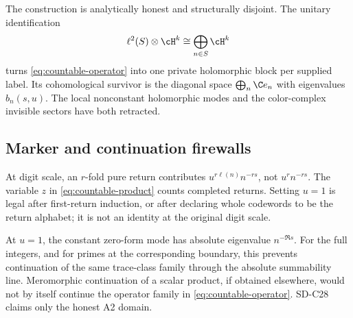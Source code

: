 The construction is analytically honest and structurally disjoint.  The
unitary identification
\begin{equation}
 \ell^2(S)\otimes\cH^k
 \cong\bigoplus_{n\in S}\cH^k
 \label{eq:unitary-disjoint}
\end{equation}
turns \eqref{eq:countable-operator} into one private holomorphic block per
supplied label.  Its cohomological survivor is the diagonal space
\(\bigoplus_n\C e_n\) with eigenvalues \(b_n(s,u)\).  The local nonconstant
holomorphic modes and the color-complex invisible sectors have both
retracted.

\subsection{Marker and continuation firewalls}

At digit scale, an \(r\)-fold pure return contributes
\(u^{r\ell(n)}n^{-rs}\), not \(u^rn^{-rs}\).  The variable \(z\) in
\eqref{eq:countable-product} counts completed returns.  Setting \(u=1\) is
legal after first-return induction, or after declaring whole codewords to be
the return alphabet; it is not an identity at the original digit scale.

At \(u=1\), the constant zero-form mode has absolute eigenvalue \(n^{-\Re s}\).
For the full integers, and for primes at the corresponding boundary, this
prevents continuation of the same trace-class family through the absolute
summability line.  Meromorphic continuation of a scalar product, if obtained
elsewhere, would not by itself continue the operator family in
\eqref{eq:countable-operator}.  SD-C28 claims only the honest A2 domain.
